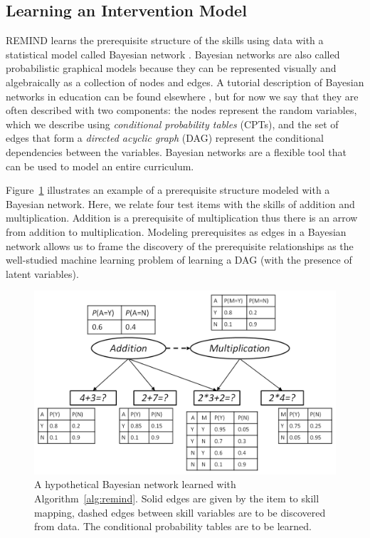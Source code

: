 \documentclass{edm_template}
\begin{document}
\subsection{Learning an Intervention Model}
\label{sec:learning_remind}

REMIND learns the prerequisite structure of the skills using data with a statistical model called Bayesian network \cite{pearl2000causality,spirtes2001causation}.
Bayesian networks are also called probabilistic graphical models  because they can  be represented visually and algebraically as a collection of nodes and edges.
A tutorial description of Bayesian networks in education can be found elsewhere \cite{almond2015bayesian}, 
but for now we say that they are often described with two components: 
the  nodes represent the random variables, which we describe using \textit{conditional probability tables} (CPTs),
and the set of edges that form a \textit{directed acyclic graph} (DAG) represent the conditional dependencies between the variables.
Bayesian networks are a flexible tool that can be used to model an entire curriculum.

Figure~\ref{fig:smexample} illustrates an example of a prerequisite structure modeled with a Bayesian network.
Here, we relate four test items with the skills of addition and multiplication.
Addition is a prerequisite of multiplication thus there is an arrow from addition to multiplication.
Modeling prerequisites as edges in a Bayesian network allows us to frame the discovery of the prerequisite relationships as the well-studied machine learning problem of learning a DAG (with the presence of latent variables).


\begin{figure}
	\begin{center}
		\includegraphics[width=1.0\linewidth]{figures/studentmodel.png}
	\end{center}
	\caption{A hypothetical Bayesian network learned with Algorithm~\ref{alg:remind}. 
		Solid edges are given by the item to skill mapping, dashed edges between skill variables are to be discovered from data.
		The conditional probability tables are to be learned.}
	\label{fig:smexample} 
\end{figure} 
\end{document}

